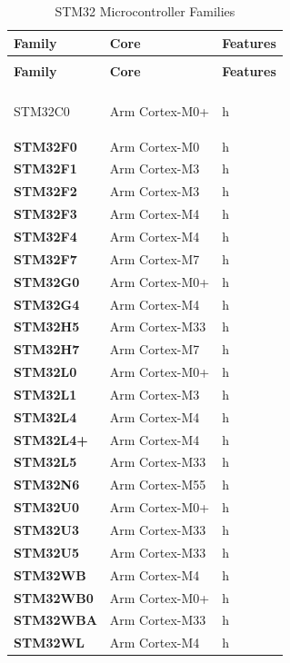\begin{xltabular}{\linewidth}{@{}>{\bfseries}l X@{} X@{}}
	\caption{STM32 Microcontroller Families\label{tab:stm32_mcu_families}} \\
	\toprule
	\textbf{Family} & \textbf{Core} & \textbf{Features} \\
	\midrule
	\endfirsthead %
	
	 \\
	\toprule
	\textbf{Family} & \textbf{Core} & \textbf{Features} \\
	\midrule
	\endhead %
	
	\midrule
	 \\
	\endfoot %
	
	\bottomrule
	\endlastfoot %
	
	STM32C0 &
	Arm Cortex-M0+ &
	h \\
	\midrule
	STM32F0 &
	Arm Cortex-M0 &
	h \\
	\midrule
	STM32F1 &
	Arm Cortex-M3 &
	h \\
	\midrule
	STM32F2 &
	Arm Cortex-M3 &
	h \\
	\midrule
	STM32F3 &
	Arm Cortex-M4 &
	h \\
	\midrule
	STM32F4 &
	Arm Cortex-M4 &
	h \\
	\midrule
	STM32F7 &
	Arm Cortex-M7 &
	h \\
	\midrule
	STM32G0 &
	Arm Cortex-M0+ &
	h \\
	\midrule
	STM32G4 &
	Arm Cortex-M4 &
	h \\
	\midrule
	STM32H5 &
	Arm Cortex-M33 &
	h \\
	\midrule
	STM32H7 &
	Arm Cortex-M7 &
	h \\
	\midrule
	STM32L0 &
	Arm Cortex-M0+ &
	h \\
	\midrule
	STM32L1 &
	Arm Cortex-M3 &
	h \\
	\midrule
	STM32L4 &
	Arm Cortex-M4 &
	h \\
	\midrule
	STM32L4+ &
	Arm Cortex-M4 &
	h \\
	\midrule
	STM32L5 &
	Arm Cortex-M33 &
	h \\
	\midrule
	STM32N6 &
	Arm Cortex-M55 &
	h \\
	\midrule
	STM32U0 &
	Arm Cortex-M0+ &
	h \\
	\midrule
	STM32U3 &
	Arm Cortex-M33 &
	h \\
	\midrule
	STM32U5 &
	Arm Cortex-M33 &
	h \\
	\midrule
	STM32WB &
	Arm Cortex-M4 &
	h \\
	\midrule
	STM32WB0 &
	Arm Cortex-M0+ &
	h \\
	\midrule
	STM32WBA &
	Arm Cortex-M33 &
	h \\
	\midrule
	STM32WL &
	Arm Cortex-M4 &
	h \\
	
\end{xltabular}

